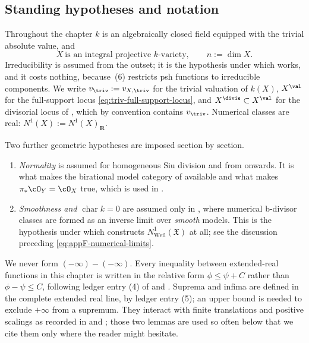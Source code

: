 \subsection{Standing hypotheses and notation}
\label{sec:ch35-hypotheses}

Throughout the chapter $k$ is an algebraically closed field equipped with
the trivial absolute value, and
\begin{equation}
\label{eq:ch35-standing}
 X\ \text{is an integral projective $k$-variety},\qquad n:=\dim X .
\end{equation}
Irreducibility is assumed from the outset; it is the hypothesis under which
\cite[\S6]{BJ22} works, and it costs nothing, because
\,(6) restricts psh functions to irreducible
components.  We write $v_{\triv}:=v_{X,\triv}$ for the trivial valuation of
$k(X)$, $X^{\val}$ for the full-support locus
\eqref{eq:triv-full-support-locus}, and $X^{\divis}\subset X^{\val}$ for
the divisorial locus of , which by
convention contains $v_{\triv}$.  Numerical classes are real:
$N^1(X):=N^1(X)_{\mathbf R}$.

Two further geometric hypotheses are imposed section by section.

\begin{enumerate}
\item \emph{Normality} is assumed for homogeneous Siu division and from
  onwards.
 It is what makes the birational model category of
  available and what makes
 $\pi_*\cO_Y=\cO_X$ true, which is used in
 .
\item \emph{Smoothness and $\operatorname{char}k=0$} are assumed only in
 , where numerical b-divisor classes are formed
 as an inverse limit over \emph{smooth} models.  This is the hypothesis
 under which  constructs
 $N^1_{\mathrm{Weil}}(\mathfrak X)$ at all; see the discussion preceding
 \eqref{eq:appF-numerical-limits}.
\end{enumerate}

We never form $(-\infty)-(-\infty)$.  Every inequality between
extended-real functions in this chapter is written in the relative form
$\phi\leq\psi+C$ rather than $\phi-\psi\leq C$, following ledger entry
(4) of  and
.  Suprema and infima are defined in the complete extended real line,
by ledger entry (5); an upper bound is needed to exclude $+\infty$
from a supremum. They interact with finite
translations and positive scalings as recorded in
 and ; those two lemmas
are used so often below that we cite them only where the reader might
hesitate.

